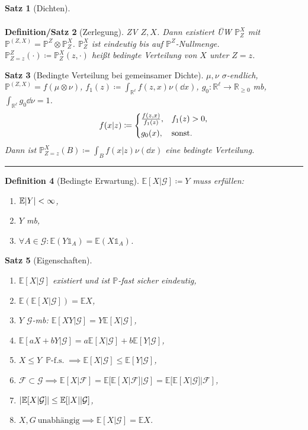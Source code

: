\documentclass[a4paper,8pt]{article}
\newcounter{Sec}
\theoremstyle{nonumberbreak}
\newtheorem{definition}{Definition}[Sec]
\newtheorem{satz}[definition]{Satz}
\newtheorem{defsatz}[definition]{Definition/Satz}
\newcommand{\sep}{%
	\rule{\linewidth}{0.15pt}%
	\stepcounter{Sec}%
	}
\newcommand{\defas}{\coloneqq}
\newcommand{\ind}{\mathds{1}}
\renewcommand{\P}{\mathbb{P}}
\newcommand{\R}{\mathbb{R}}
\newcommand{\E}{\mathbb{E}}
\newcommand{\EV}[2]{\E[#1|#2]}
\newcommand{\BE}[2]{\EV{#1}{\mathcal{#2}}}
\newcommand{\fs}[1]{~\operatorname{#1-f.s.}}
\begin{document}
\begin{multicols}{3}
\begin{satz}[Dichten]
\begin{align*}
		\end{align*}
	\end{satz}
	\begin{defsatz}[Zerlegung]
		ZV $Z, X$. Dann existiert ÜW $\P^X_Z$ mit $\P^{(Z, X)}=\P^Z\otimes\P^X_Z$.
		$\P^X_Z$ ist eindeutig bis auf $\P^Z$-Nullmenge.
		$\P^Z_{Z=z}(\cdot)\defas\P^X_Z(z, \cdot)$ heißt bedingte Verteilung von $X$ unter $Z=z$.
	\end{defsatz}
	\begin{satz}[Bedingte Verteilung bei gemeinsamer Dichte]
		$\mu, \nu$ $\sigma$-endlich, $\P^{(Z, X)}=f(\mu\otimes\nu)$, $f_1(z)\defas\int_{\R^\ell}f(z, x)\nu(\dd{x})$,
		$g_0\colon\R^\ell\to\R_{\geq0}$ mb, $\int_{\R^\ell}g_0\dd{\nu}=1$.
		\[
			f(x|z)\defas\begin{cases*}
				\frac{f(z, x)}{f_1(z)}, &$f_1(z)>0$,\\
				g_0(x), &sonst.
			\end{cases*}
		\]
		Dann ist $\P^X_{Z=z}(B)\defas\int_Bf(x|z)\nu(\dd{x})$ eine bedingte Verteilung.
	\end{satz}
	\sep
	\begin{definition}[Bedingte Erwartung]
		$\BE{X}{G}\defas Y$ muss erfüllen:
		\begin{enumerate}[label=(\alph*)]
			\item $\E\abs{Y}<\infty$,
			\item $Y$ mb,
			\item $\forall A\in\mathcal{G}:\E(Y\ind_A)=\E(X\ind_A)$.
		\end{enumerate}
	\end{definition}
	\begin{satz}[Eigenschaften]
		\begin{enumerate}[label=(\alph*)]
			\item $\BE{X}{G}$ existiert und ist $\P$-fast sicher eindeutig,
			\item $\E(\BE{X}{G})=\E X$,
			\item $Y$ $\mathcal{G}$-mb: $\BE{XY}{G}=Y\BE{X}{G}$,
			\item $\BE{aX+bY}{G}=a\BE{X}{G}+b\BE{Y}{G}$,
			\item $X\leq Y\fs{\P}\implies\BE{X}{G}\leq\BE{Y}{G}$,
			\item $\mathcal{F}\subset\mathcal{G}\implies \BE{X}{F}=\BE{\BE{X}{F}}{G}=\BE{\BE{X}{G}}{F}$,
			\item $\abs{\BE{X}{G}}\leq\BE{\abs{X}}{G}$,
			\item $X, G~\text{unabhängig}\implies\BE{X}{G}=\E X$.
		\end{enumerate}

\end{satz}
\end{multicols}
\end{document}

